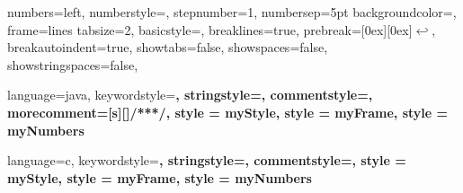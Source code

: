 

\usepackage[T1]{fontenc}
\usepackage[utf8]{inputenc}

\usepackage{ngerman}
\usepackage[ngerman]{babel}
\usepackage[babel,german=quotes]{csquotes}

\usepackage{graphicx}
\usepackage[dvipsnames]{xcolor}
\usepackage{a4}
\usepackage{caption}

\usepackage[onehalfspacing]{setspace}

\usepackage{mathtools}
\usepackage{amsmath}
\usepackage{amssymb}

\usepackage{listings}

 {
	numbers=left,
	numberstyle=\tiny\color{black},
	stepnumber=1,
	numbersep=5pt
}
 {
	backgroundcolor=\color{white},
	frame=lines
}
 {
	tabsize=2,
	basicstyle=\ttfamily\small,
	breaklines=true,
	prebreak=\raisebox{0ex}[0ex][0ex]{\ensuremath{\hookleftarrow}},
	breakautoindent=true,
	showtabs=false,
    showspaces=false,
    showstringspaces=false,
}

 {
	language=java,
 	keywordstyle=\color{javapurple}\bfseries,
   	stringstyle=\color{javared},   
   	commentstyle=\color{javagreen},
    morecomment=[s][\color{javadocblue}]{/**}{*/},
    style = myStyle,
    style = myFrame,
    style = myNumbers
}

 {
	language=c,
 	keywordstyle=\color{blue}\bfseries,
   	stringstyle=\color{gray},   
   	commentstyle=\color{green},
   	style = myStyle,
    style = myFrame,
    style = myNumbers
} 

\usepackage[printonlyused]{acronym}
\usepackage[linktoc=all, hidelinks]{hyperref}
\usepackage{booktabs}

\usepackage{bibgerm}


\captionsetup[table]{belowskip=8pt}
